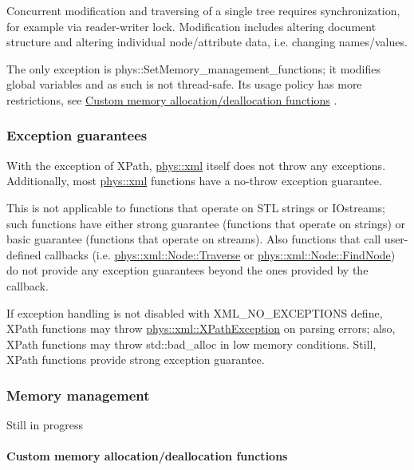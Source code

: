 Concurrent modification and traversing of a single tree requires synchronization, for example via reader-\/writer lock. Modification includes altering document structure and altering individual node/attribute data, i.e. changing names/values. \par
 \par
 The only exception is phys::SetMemory\_\-management\_\-functions; it modifies global variables and as such is not thread-\/safe. Its usage policy has more restrictions, see \hyperlink{XMLManual_XMLCustomAlloc}{Custom memory allocation/deallocation functions} . \hypertarget{XMLManual_XMLExceptionSafety}{}\subsubsection{Exception guarantees}\label{XMLManual_XMLExceptionSafety}
With the exception of XPath, \hyperlink{namespacephys_1_1xml}{phys::xml} itself does not throw any exceptions. Additionally, most \hyperlink{namespacephys_1_1xml}{phys::xml} functions have a no-\/throw exception guarantee. \par
 \par
 This is not applicable to functions that operate on STL strings or IOstreams; such functions have either strong guarantee (functions that operate on strings) or basic guarantee (functions that operate on streams). Also functions that call user-\/defined callbacks (i.e. \hyperlink{classphys_1_1xml_1_1Node_a0029d08d3689c36d882ada0c0c9cf6e9}{phys::xml::Node::Traverse} or \hyperlink{classphys_1_1xml_1_1Node_ab2311cefdf1d7f4886cbebd7350d7731}{phys::xml::Node::FindNode}) do not provide any exception guarantees beyond the ones provided by the callback. \par
 \par
 If exception handling is not disabled with XML\_\-NO\_\-EXCEPTIONS define, XPath functions may throw \hyperlink{classphys_1_1xml_1_1XPathException}{phys::xml::XPathException} on parsing errors; also, XPath functions may throw std::bad\_\-alloc in low memory conditions. Still, XPath functions provide strong exception guarantee. \hypertarget{XMLManual_XMLMemory}{}\subsubsection{Memory management}\label{XMLManual_XMLMemory}
Still in progress \hypertarget{XMLManual_XMLCustomAlloc}{}\paragraph{Custom memory allocation/deallocation functions}\label{XMLManual_XMLCustomAlloc}
